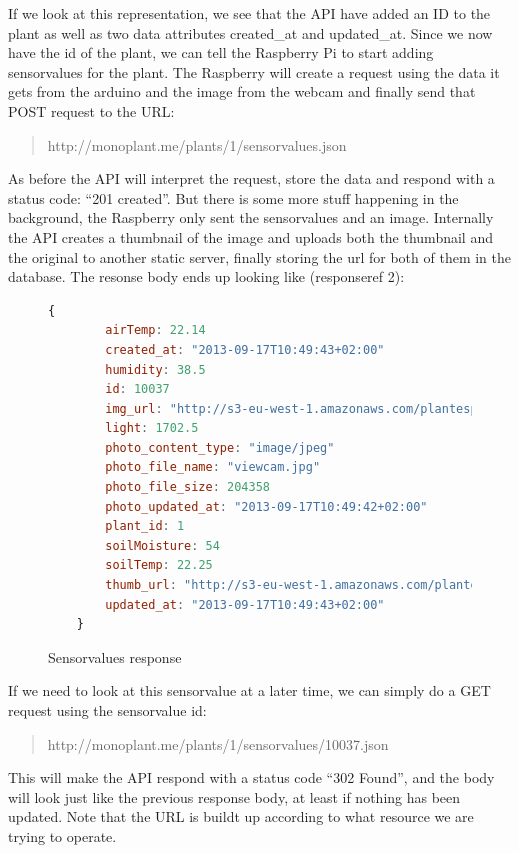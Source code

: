 If we look at this representation, we see that the API have added an ID to the plant as well as two data attributes created\_at and updated\_at. Since we now have the id of the plant, we can tell the Raspberry Pi to start adding sensorvalues for the plant. The Raspberry will create a request using the data it gets from the arduino and the image from the webcam and finally send that POST request to the URL:

\begin{quote}
http://monoplant.me/plants/1/sensorvalues.json 
\end{quote}

As before the API will interpret the request, store the data and respond with a status code: “201 created”. But there is some more stuff happening in the background, the Raspberry only sent the sensorvalues and an image. Internally the API creates a thumbnail of the image and uploads both the thumbnail and the original to another static server, finally storing the url for both of them in the database. The resonse body ends up looking like (responseref 2):

\begin{figure}
	\begin{lstlisting}[language=javascript]
	{
		airTemp: 22.14
		created_at: "2013-09-17T10:49:43+02:00"
		humidity: 38.5
		id: 10037
		img_url: "http://s3-eu-west-1.amazonaws.com/plantespann/2013/9/17/original/10037.jpg?1379407782"
		light: 1702.5
		photo_content_type: "image/jpeg"
		photo_file_name: "viewcam.jpg"
		photo_file_size: 204358
		photo_updated_at: "2013-09-17T10:49:42+02:00"
		plant_id: 1
		soilMoisture: 54
		soilTemp: 22.25
		thumb_url: "http://s3-eu-west-1.amazonaws.com/plantespann/2013/9/17/thumb/10037.jpg?1379407782"
		updated_at: "2013-09-17T10:49:43+02:00"
	}
	\end{lstlisting}
	\caption{Sensorvalues response}
	\label{fig:sensorvaluesresponse}
\end{figure}

If we need to look at this sensorvalue at a later time, we can simply do a GET request using the sensorvalue id:

\begin{quote}
http://monoplant.me/plants/1/sensorvalues/10037.json 
\end{quote}

This will make the API respond with a status code “302 Found”, and the body will look just like the previous response body, at least if nothing has been updated. Note that the URL is buildt up according to what resource we are trying to operate. 

